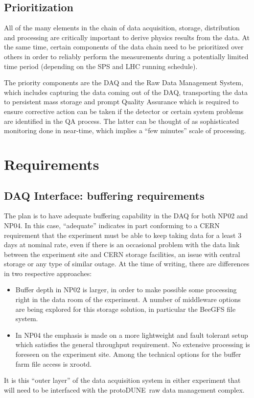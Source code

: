 \documentclass[pdftex,12pt,letter]{article}
\newcommand{\pd}{protoDUNE\ }
\begin{document}
\subsection{Prioritization}

All of the many elements in the chain of data acquisition, storage, distribution and processing are critically important to derive physics results  from the data.
At the same time, certain components of the data chain need to be prioritized over others in order to reliably perform the measurements during a potentially
limited time period (depending on the SPS and LHC running schedule).

The priority components are the DAQ and the Raw Data Management System, which includes capturing the data coming out of the DAQ,
transporting the data to persistent mass storage and prompt Quality Assurance which is required to ensure corrective action can be taken
if the detector or certain system problems are identified in the QA process. The latter can be thought of as sophisticated monitoring done in near-time,
which implies a ``few minutes'' scale of processing.

\section{Requirements}
\subsection{DAQ Interface: buffering requirements}
\label{sec:daq_interface}
The plan is to have adequate buffering capability in the DAQ for both NP02 and NP04. In this case, “adequate” indicates in part conforming to a CERN requirement that the experiment must be able to keep taking data for a least 3 days at nominal rate, even if there is an occasional problem with the data link between the experiment site and CERN storage facilities, an issue with central storage or any type of similar outage. At the time of writing, there are differences in two respective approaches:
\begin{itemize}
\item Buffer depth in NP02 is larger, in order to make possible some processing right in the data room of the experiment. A number of middleware options are being explored for this storage solution, in particular the BeeGFS file system.

\item In NP04 the emphasis is made on a more lightweight and fault tolerant setup which satisfies the general throughput requirement. No extensive processing is foreseen on the experiment site. Among the technical options for the buffer farm file access is xrootd.
\end{itemize}
It is this ``outer layer'' of the data acquisition system in either experiment that will need to be interfaced with the \pd raw data management complex.
\end{document}
